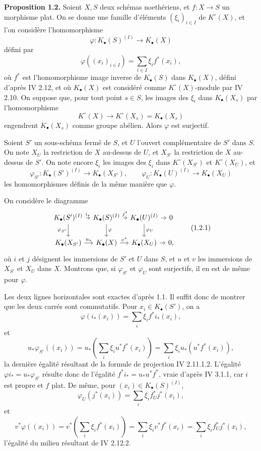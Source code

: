\documentclass[11pt]{article}
\begin{document}
\textbf{Proposition 1.2.} Soient $X,S$ deux schémas noethériens, et $f:X\to S$ un morphisme plat. On se donne une famille d'éléments $(\xi_i)_{i\in I}$ de $K^\circ(X)$, et l'on considère l'homomorphisme
\[
\varphi:K_\bullet(S)^{(I)}\longrightarrow K_\bullet(X)
\]
défini par
\[
\varphi((x_i)_{i\in I})=\sum_{i\in I}\xi_i f^*(x_i),
\]
où $f^*$ est l'homomorphisme image inverse de $K_\bullet(S)$ dans $K_\bullet(X)$, défini d'après IV 2.12, et où $K_\bullet(X)$ est considéré comme $K^\circ(X)$-module par IV 2.10. On suppose que, pour tout point $s\in S$, les images des $\xi_i$ dans $K_\bullet(X_s)$ par l'homomorphisme
\[
K^\circ(X)\longrightarrow K^\circ(X_s)=K_\bullet(X_s)
\]
engendrent $K_\bullet(X_s)$ comme groupe abélien. Alors $\varphi$ est surjectif.

Soient $S'$ un sous-schéma fermé de $S$, et $U$ l'ouvert complémentaire de $S'$ dans $S$. On note $X_U$ la restriction de $X$ au-dessus de $U$, et $X_{S'}$ la restriction de $X$ au-dessus de $S'$. On note encore $\xi_i$ les images des $\xi_i$ dans $K^\circ(X_{S'})$ et $K^\circ(X_U)$, et
\[
\varphi_{S'}:K_\bullet(S')^{(I)}\to K_\bullet(X_{S'}),\qquad
\varphi_U:K_\bullet(U)^{(I)}\to K_\bullet(X_U)
\]
les homomorphismes définis de la même manière que $\varphi$.

On considère le diagramme
\[
\begin{tikzcd}[column sep=tiny]
K_\bullet(S')^{(I)} \arrow[r,"i_*"] \arrow[d,"\varphi_{S'}"'] & K_\bullet(S)^{(I)} \arrow[r,"j^*"] \arrow[d,"\varphi"] & K_\bullet(U)^{(I)} \arrow[r] \arrow[d,"\varphi_U"] & 0\\
K_\bullet(X_{S'}) \arrow[r,"u_*"] & K_\bullet(X) \arrow[r,"v^*"] & K_\bullet(X_U) \arrow[r] & 0,
\end{tikzcd}\tag{1.2.1}
\]
où $i$ et $j$ désignent les immersions de $S'$ et $U$ dans $S$, et $u$ et $v$ les immersions de $X_{S'}$ et $X_U$ dans $X$. Montrons que, si $\varphi_{S'}$ et $\varphi_U$ sont surjectifs, il en est de même pour $\varphi$.

Les deux lignes horizontales sont exactes d'après 1.1. Il suffit donc de montrer que les deux carrés sont commutatifs. Pour $x_i\in K_\bullet(S')$, on a
\[
\varphi(i_*(x_i))=\sum_i \xi_i f^*i_*(x_i),
\]
et
\[
u_*\varphi_{S'}((x_i))=u_*\left(\sum_i\xi_i u^*f^*(x_i)\right)
=\sum_i\xi_i u_*(u^*f^*(x_i)),
\]
la dernière égalité résultant de la formule de projection IV 2.11.1.2. L'égalité $\varphi i_*=u_*\varphi_{S'}$ résulte donc de l'égalité $f^*i_*=u_*u^*f^*$, vraie d'après IV 3.1.1, car $i$ est propre et $f$ plat. De même, pour $(x_i)\in K_\bullet(S)^{(I)}$,
\[
\varphi_U(j^*(x_i))=\sum_i\xi_i f_U^*j^*(x_i),
\]
et
\[
v^*\varphi((x_i))=v^*\left(\sum_i\xi_i f^*(x_i)\right)=\sum_i\xi_i v^*f^*(x_i)=\sum_i\xi_i f_U^*j^*(x_i),
\]
l'égalité du milieu résultant de IV 2.12.2.
\end{document}
